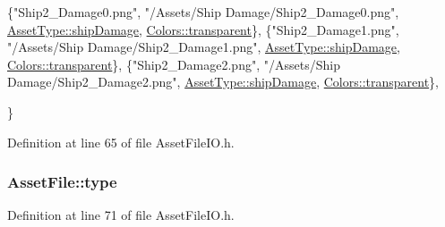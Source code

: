 \begin{DoxyCode}
    \{\textcolor{stringliteral}{"Ship2\_Damage0.png"}, \textcolor{stringliteral}{"/Assets/Ship Damage/Ship2\_Damage0.png"}, 
      \hyperlink{_asset_file_i_o_8h_a72d924d1cb8e1544b6d5198e98d52ca9a6ea4f9678cf690cec660433e498121df}{AssetType::shipDamage}, \hyperlink{_character_data_8h_a55ecd4f2ec2ebfe8d5b0163e4ac2a967a5e96bf62b9b2c18fdb65564b4a18fd1f}{Colors::transparent}\},
    \{\textcolor{stringliteral}{"Ship2\_Damage1.png"}, \textcolor{stringliteral}{"/Assets/Ship Damage/Ship2\_Damage1.png"}, 
      \hyperlink{_asset_file_i_o_8h_a72d924d1cb8e1544b6d5198e98d52ca9a6ea4f9678cf690cec660433e498121df}{AssetType::shipDamage}, \hyperlink{_character_data_8h_a55ecd4f2ec2ebfe8d5b0163e4ac2a967a5e96bf62b9b2c18fdb65564b4a18fd1f}{Colors::transparent}\},
    \{\textcolor{stringliteral}{"Ship2\_Damage2.png"}, \textcolor{stringliteral}{"/Assets/Ship Damage/Ship2\_Damage2.png"}, 
      \hyperlink{_asset_file_i_o_8h_a72d924d1cb8e1544b6d5198e98d52ca9a6ea4f9678cf690cec660433e498121df}{AssetType::shipDamage}, \hyperlink{_character_data_8h_a55ecd4f2ec2ebfe8d5b0163e4ac2a967a5e96bf62b9b2c18fdb65564b4a18fd1f}{Colors::transparent}\},
    
\}
\end{DoxyCode}


Definition at line 65 of file Asset\-File\-I\-O.\-h.

\hypertarget{struct_asset_file_ad154debe8690c8bd1c29d091cabea4e7}{
\subsubsection[{type}]{ Asset\-File\-::type}}\label{struct_asset_file_ad154debe8690c8bd1c29d091cabea4e7}


Definition at line 71 of file Asset\-File\-I\-O.\-h.

